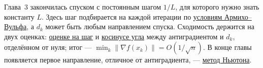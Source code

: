 Глава~3 закончилась спуском с постоянным шагом $1/L$, для которого нужно знать константу $L$. Здесь шаг подбирается на каждой итерации по \hyperref[note:5330B23D-95DD-4D5D-B4A3-63EBADB1DB7D]{условиям Армихо--Вульфа}, а $d_k$ может быть любым направлением спуска. Сходимость держится на двух оценках: \hyperref[note:93FC9CC4-79FA-4CEA-9B10-9DBFB2C07850]{оценке на шаг} и \hyperref[note:E4AE9B25-BDB9-4A54-8CCB-09809F20B79D]{косинусе угла} между антиградиентом и $d_k$, отделённом от нуля; итог --- $\min_k \|\nabla f(x_k)\| = O(1/\sqrt{n})$. В конце главы появляется первое направление, отличное от антиградиента, --- \hyperref[note:C0ED5501-CFC6-42BA-A53A-1B346CBA545D]{метод Ньютона}.
